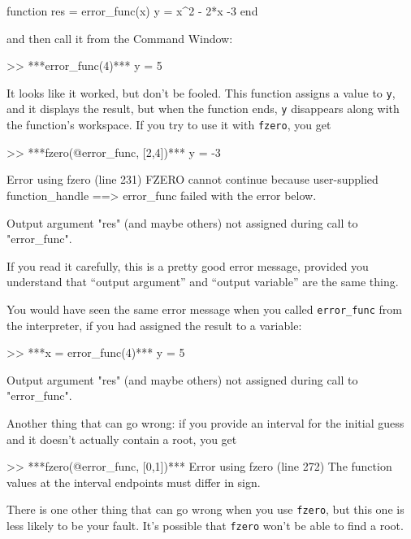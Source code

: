 \begin{code}
function res = error_func(x)
    y = x^2 - 2*x -3
end
\end{code}

and then call it from the Command Window:

\begin{code}
>> ***error_func(4)***
y = 5
\end{code}

It looks like it worked, but don't be fooled.  This function assigns
a value to {\tt y}, and it displays the result, but when the function
ends, {\tt y} disappears along with the function's workspace.
If you try to use it with {\tt fzero}, you get

\begin{code}
>> ***fzero(@error_func, [2,4])***
y = -3

Error using fzero (line 231)
FZERO cannot continue because user-supplied function_handle ==>
error_func failed with the error below.

Output argument "res" (and maybe others) not assigned during call
to "error_func".
\end{code}

If you read it carefully, this is a pretty good error message,
provided you understand that ``output argument'' and ``output variable'' are the same thing.


You would have seen the same error message when you called \verb"error_func" from the interpreter, if you had assigned the result
to a variable:

\begin{code}
>> ***x = error_func(4)***
y = 5

Output argument "res" (and maybe others) not assigned during
call to "error_func".
\end{code}

Another thing that can go wrong: if you provide an interval for the
initial guess and it doesn't actually contain a root, you get

\begin{code}
>> ***fzero(@error_func, [0,1])***
Error using fzero (line 272)
The function values at the interval endpoints must differ in sign.
\end{code}


There is one other thing that can go wrong when you use {\tt fzero}, but
this one is less likely to be your fault.  It's possible that {\tt fzero}
won't be able to find a root.

